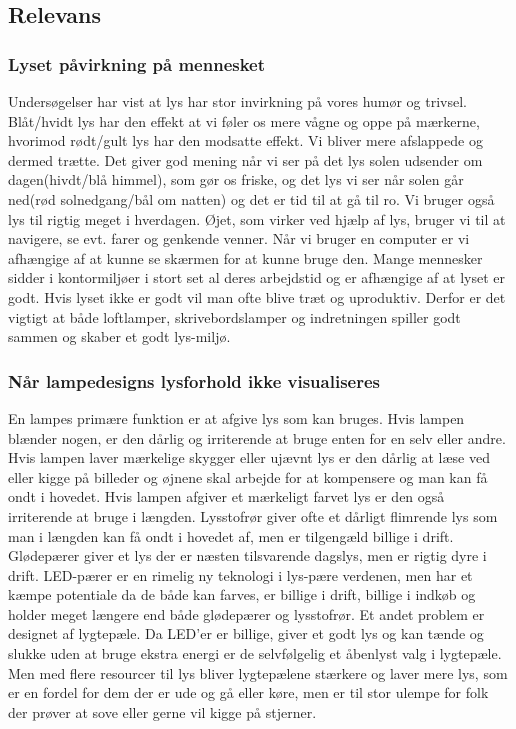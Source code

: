 \subsection{Relevans}
\subsubsection{Lyset påvirkning på mennesket}

Undersøgelser har vist at lys har stor invirkning på vores humør og trivsel.
Blåt/hvidt lys har den effekt at vi føler os mere vågne og oppe på mærkerne\cite{videnskab_dk_påvirkning},
hvorimod rødt/gult lys har den modsatte effekt. Vi bliver mere afslappede og dermed trætte.
Det giver god mening når vi ser på det lys solen udsender om dagen(hivdt/blå himmel), som gør os friske, og det 
lys vi ser når solen går ned(rød solnedgang/bål om natten) og det er tid til at gå til ro.
Vi bruger også lys til rigtig meget i hverdagen. Øjet, som virker ved hjælp af lys\cite{optikerforeningen_synet},
bruger vi til at navigere, se evt. farer og genkende venner. Når vi bruger en computer er vi afhængige 
af at kunne se skærmen for at kunne bruge den. 
Mange mennesker sidder i kontormiljøer i stort set al deres arbejdstid og er afhængige af at lyset er godt.
Hvis lyset ikke er godt vil man ofte blive træt og uproduktiv. Derfor er det vigtigt at både loftlamper, 
skrivebordslamper og indretningen spiller godt sammen og skaber et godt lys-miljø.


\subsubsection{Når lampedesigns lysforhold ikke visualiseres}

En lampes primære funktion er at afgive lys som kan bruges. Hvis lampen blænder nogen, er den dårlig og irriterende
at bruge enten for en selv eller andre. Hvis lampen laver mærkelige skygger eller ujævnt lys er den dårlig at læse ved 
eller kigge på billeder og øjnene skal arbejde for at kompensere og man kan få ondt i hovedet.
Hvis lampen afgiver et mærkeligt farvet lys er den også irriterende at bruge i længden. 
Lysstofrør giver ofte et dårligt flimrende lys som man i længden kan få ondt i hovedet af, men er tilgengæld billige i drift.
Glødepærer giver et lys der er næsten tilsvarende dagslys, men er rigtig dyre i drift\cite{videnskab_dk_led}.
LED-pærer er en rimelig ny teknologi i lys-pære verdenen, men har et kæmpe potentiale da de både kan farves,
er billige i drift, billige i indkøb og holder meget længere end både glødepærer og lysstofrør.
Et andet problem er designet af lygtepæle. Da LED'er er billige, giver et godt lys og kan tænde og slukke 
uden at bruge ekstra energi er de selvfølgelig et åbenlyst valg i lygtepæle. Men med flere resourcer til lys bliver 
lygtepælene stærkere og laver mere lys, som er en fordel for dem der er ude og gå eller køre, men er til stor ulempe 
for folk der prøver at sove eller gerne vil kigge på stjerner\cite{dr_dk_lysforurening}.